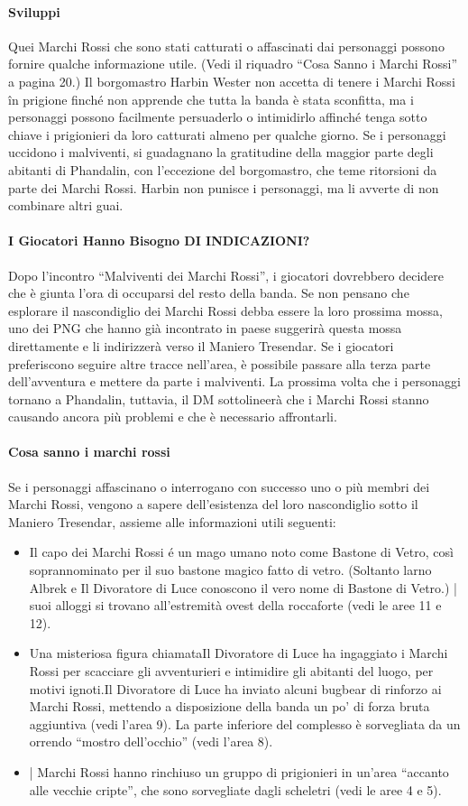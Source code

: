 \documentclass{article}
\begin{document}
\paragraph{Sviluppi}Quei Marchi Rossi che sono stati catturati o affascinati dai
personaggi possono fornire qualche informazione utile.
(Vedi il riquadro “Cosa Sanno i Marchi Rossi” a pagina
20.) Il borgomastro Harbin Wester non accetta di tenere i
Marchi Rossi în prigione finché non apprende che tutta la
banda è stata sconfitta, ma i personaggi possono facilmente
persuaderlo o intimidirlo affinché tenga sotto chiave i
prigionieri da loro catturati almeno per qualche giorno.
Se i personaggi uccidono i malviventi, si guadagnano la
gratitudine della maggior parte degli abitanti di Phandalin,
con l'eccezione del borgomastro, che teme ritorsioni da parte
dei Marchi Rossi. Harbin non punisce i personaggi, ma li
avverte di non combinare altri guai.
\paragraph{I Giocatori Hanno Bisogno DI INDICAZIONI?}Dopo l'incontro “Malviventi dei Marchi Rossi”, i giocatori dovrebbero
decidere che è giunta l’ora di occuparsi del resto della banda. Se non
pensano che esplorare il nascondiglio dei Marchi Rossi debba essere
la loro prossima mossa, uno dei PNG che hanno già incontrato in
paese suggerirà questa mossa direttamente e li indirizzerà verso il
Maniero Tresendar. Se i giocatori preferiscono seguire altre tracce
nell’area, è possibile passare alla terza parte dell'avventura e mettere
da parte i malviventi. La prossima volta che i personaggi tornano
a Phandalin, tuttavia, il DM sottolineerà che i Marchi Rossi stanno
causando ancora più problemi e che è necessario affrontarli.
\paragraph{Cosa sanno i marchi rossi}
\hypertarget{cosasanno}{}
Se i personaggi affascinano o interrogano con successo uno o più
membri dei Marchi Rossi, vengono a sapere dell’esistenza del loro
nascondiglio sotto il Maniero Tresendar, assieme alle informazioni
utili seguenti:
\begin{itemize}
    \item  Il capo dei Marchi Rossi é un mago umano noto come Bastone
di Vetro, così soprannominato per il suo bastone magico fatto di
vetro. (Soltanto larno Albrek e Il Divoratore di Luce conoscono il vero
nome di Bastone di Vetro.) | suoi alloggi si trovano all'estremità
ovest della roccaforte (vedi le aree 11 e 12).
    \item  Una misteriosa figura chiamataIl Divoratore di Luce ha ingaggiato i
Marchi Rossi per scacciare gli avventurieri e intimidire gli abitanti
del luogo, per motivi ignoti.Il Divoratore di Luce ha inviato alcuni
bugbear di rinforzo ai Marchi Rossi, mettendo a disposizione
della banda un po’ di forza bruta aggiuntiva (vedi l’area 9).
La parte inferiore del complesso è sorvegliata da un orrendo
“mostro dell'occhio” (vedi l'area 8).
    \item | Marchi Rossi hanno rinchiuso un gruppo di prigionieri in
un'area “accanto alle vecchie cripte”, che sono sorvegliate dagli
scheletri (vedi le aree 4 e 5).
\end{itemize}
\end{document}
